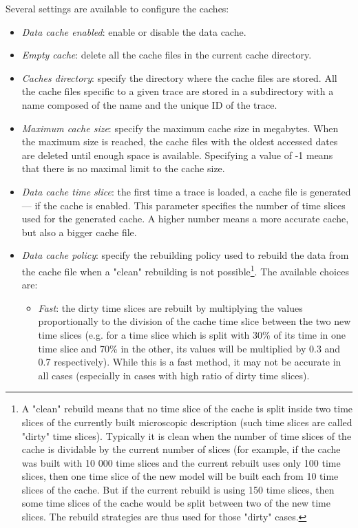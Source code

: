 \documentclass[twoside]{article}
\begin{document}
\begin{sloppypar}
Several settings are available to configure the caches:
\begin{itemize}
	\item \textit{Data cache enabled}: enable or disable the data cache.
	\item \textit{Empty cache}: delete all the cache files in the current cache directory.
	\item \textit{Caches directory}: specify the directory where the cache files are stored. All the cache files specific to a given trace are stored in a subdirectory with a name composed of the name and the unique ID of the trace.
	\item \textit{Maximum cache size}: specify the maximum cache size in megabytes. When the maximum size is reached, the cache files with the oldest accessed dates are deleted until enough space is available. Specifying a value of -1 means that there is no maximal limit to the cache size.
	\item \textit{Data cache time slice}: the first time a trace is loaded, a cache file is generated --- if the cache is enabled. This parameter specifies the number of time slices used for the generated cache. A higher number means a more accurate cache, but also a bigger cache file.
	\item \textit{Data cache policy}: specify the rebuilding policy used to rebuild the data from the cache file when a "clean" rebuilding is not possible\footnote{A "clean" rebuild means that no time slice of the cache is split inside two time slices of the currently built microscopic description (such time slices are called "dirty" time slices). Typically it is clean when the number of time slices of the cache is dividable by the current number of slices (for example, if the cache was built with 10 000 time slices and the current rebuilt uses only 100 time slices, then one time slice of the new model will be built each from 10 time slices of the cache. But if the current rebuild is using 150 time slices, then some time slices of the cache would be split between two of the new time slices. The rebuild strategies are thus used for those "dirty" cases.}. The available choices are:
	\begin{itemize}
		\item \textit{Fast}: the dirty time slices are rebuilt by multiplying the values proportionally to the division of the cache time slice between the two new time slices (e.g. for a time slice which is split with 30\% of its time in one time slice and 70\% in the other, its values will be multiplied by 0.3 and 0.7 respectively). While this is a fast method, it may not be accurate in all cases (especially in cases with high ratio of dirty time slices).

\end{itemize}
\end{itemize}
\end{sloppypar}
\end{document}
